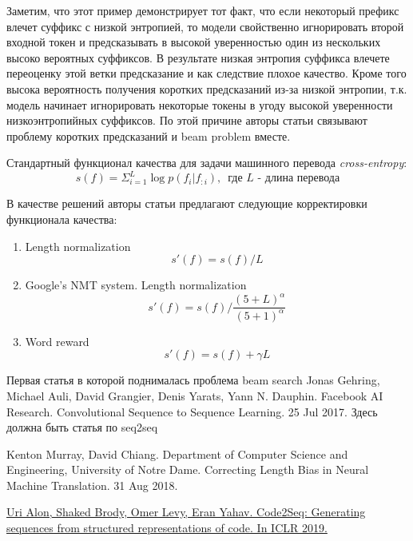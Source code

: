 \documentclass[a4paper,12pt]{article} %
\begin{document}
	Заметим, что этот пример демонстрирует тот факт, что если некоторый префикс влечет суффикс с низкой энтропией, то модели свойственно игнорировать второй входной токен и предсказывать в высокой уверенностью один из нескольких высоко вероятных суффиксов. В результате низкая энтропия суффикса влечете переоценку этой ветки предсказание и как следствие плохое качество. Кроме того высока вероятность получения коротких предсказаний из-за низкой энтропии, т.к. модель начинает игнорировать некоторые токены в угоду высокой уверенности низкоэнтропийных суффиксов. По этой причине авторы статьи связывают проблему коротких предсказаний и beam problem вместе.
	
	Стандартный функционал качества для задачи машинного перевода \textit{cross-entropy}:
	\begin{equation}
		s(f) = \Sigma_{i=1}^{L}\log p(f_i | f_{:i}), \,\,\, \text{где $L$ - длина перевода}
	\end{equation}
	
	В качестве решений авторы статьи предлагают следующие корректировки функционала качества:
	\begin{enumerate}
		\item Length normalization
		\begin{equation}
			s'(f) = s(f) / L
		\end{equation}
		
		\item Google's NMT system. Length normalization
		\begin{equation}
			s'(f) = s(f) \Big/ \frac{(5 + L) ^ \alpha}{(5 + 1) ^ \alpha}
		\end{equation}
		
		\item Word reward
		\begin{equation}
			s'(f) = s(f) + \gamma L
		\end{equation}
	\end{enumerate}
	
	
		
	
	\begin{thebibliography}{0}
		\hypertarget{beam_prob1}{}
		Первая статья в которой поднималась проблема beam search
		\hypertarget{fconv}{}
		Jonas Gehring, Michael Auli, David Grangier, Denis Yarats, Yann N. Dauphin. Facebook AI Research. Convolutional Sequence to Sequence Learning. 25 Jul 2017.
		\hypertarget{seq2seq}{}
		Здесь должна быть статья по seq2seq
		
		\hypertarget{corr_len_bias}{}
		Kenton Murray, David Chiang. Department of Computer Science and Engineering, University of Notre Dame. Correcting Length Bias in Neural Machine Translation. 31 Aug 2018.
		
		
		\hypertarget{code2seq}{}
		\href{https://openreview.net/pdf?id=H1gKYo09tX}
		{Uri Alon, Shaked Brody, Omer Levy, Eran Yahav. Code2Seq: Generating sequences from structured representations of code. In ICLR 2019.}
	\end{thebibliography}
\end{document}

